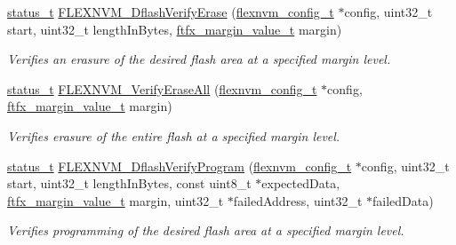 \begin{DoxyCompactItemize}
\item 
\mbox{\hyperlink{group__ksdk__common_gaaabdaf7ee58ca7269bd4bf24efcde092}{status\+\_\+t}} \mbox{\hyperlink{group__ftfx__flexnvm__driver_gadad21e35f543ca53898e3cb095b7e5cb}{F\+L\+E\+X\+N\+V\+M\+\_\+\+Dflash\+Verify\+Erase}} (\mbox{\hyperlink{group__ftfx__flexnvm__driver_ga8fd4d473c0a4b30cac163160fb28a6c1}{flexnvm\+\_\+config\+\_\+t}} $\ast$config, uint32\+\_\+t start, uint32\+\_\+t length\+In\+Bytes, \mbox{\hyperlink{group__ftfx__controller_ga2cef5154a854c303445b4bd5139f6392}{ftfx\+\_\+margin\+\_\+value\+\_\+t}} margin)
\begin{DoxyCompactList}\small\item\em Verifies an erasure of the desired flash area at a specified margin level. \end{DoxyCompactList}\item 
\mbox{\hyperlink{group__ksdk__common_gaaabdaf7ee58ca7269bd4bf24efcde092}{status\+\_\+t}} \mbox{\hyperlink{group__ftfx__flexnvm__driver_ga4478096a94795d67d2705adb7a740fe7}{F\+L\+E\+X\+N\+V\+M\+\_\+\+Verify\+Erase\+All}} (\mbox{\hyperlink{group__ftfx__flexnvm__driver_ga8fd4d473c0a4b30cac163160fb28a6c1}{flexnvm\+\_\+config\+\_\+t}} $\ast$config, \mbox{\hyperlink{group__ftfx__controller_ga2cef5154a854c303445b4bd5139f6392}{ftfx\+\_\+margin\+\_\+value\+\_\+t}} margin)
\begin{DoxyCompactList}\small\item\em Verifies erasure of the entire flash at a specified margin level. \end{DoxyCompactList}\item 
\mbox{\hyperlink{group__ksdk__common_gaaabdaf7ee58ca7269bd4bf24efcde092}{status\+\_\+t}} \mbox{\hyperlink{group__ftfx__flexnvm__driver_ga37f520d7d2a26108946a3d3d310ba692}{F\+L\+E\+X\+N\+V\+M\+\_\+\+Dflash\+Verify\+Program}} (\mbox{\hyperlink{group__ftfx__flexnvm__driver_ga8fd4d473c0a4b30cac163160fb28a6c1}{flexnvm\+\_\+config\+\_\+t}} $\ast$config, uint32\+\_\+t start, uint32\+\_\+t length\+In\+Bytes, const uint8\+\_\+t $\ast$expected\+Data, \mbox{\hyperlink{group__ftfx__controller_ga2cef5154a854c303445b4bd5139f6392}{ftfx\+\_\+margin\+\_\+value\+\_\+t}} margin, uint32\+\_\+t $\ast$failed\+Address, uint32\+\_\+t $\ast$failed\+Data)
\begin{DoxyCompactList}\small\item\em Verifies programming of the desired flash area at a specified margin level. \end{DoxyCompactList}\end{DoxyCompactItemize}
